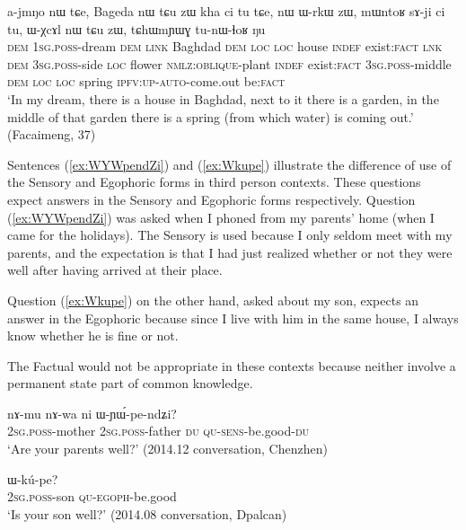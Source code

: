\documentclass[oldfontcommands,oneside,a4paper,11pt]{article}
\newcommand{\ipa}[1]{{\phon \mbox{#1}}} %
\newcommand{\refb}[1]{(\ref{#1})}
\begin{document}
\begin{exe}
\ex  \label{ex:ajmNo}
\gll \ipa{nɯ}	\ipa{a-jmŋo}	\ipa{nɯ}	\ipa{tɕe,}	Bageda	\ipa{nɯ} \ipa{tɕu}	\ipa{zɯ}	\ipa{kha}	\ipa{ci}	\ipa{tu}	\ipa{tɕe,} \ipa{nɯ}	\ipa{ɯ-rkɯ}	\ipa{zɯ,}	\ipa{mɯntoʁ}	\ipa{sɤ-ji}	\ipa{ci}	\ipa{tu,}	\ipa{ɯ-χcɤl}	\ipa{nɯ} \ipa{tɕu}	\ipa{zɯ,}	\ipa{tɕhɯmɲɯɣ}	\ipa{tu-nɯ-ɬoʁ}	\ipa{ŋu} \\
\textsc{dem} \textsc{1sg.poss}-dream \textsc{dem} \textsc{link} Baghdad \textsc{dem} \textsc{loc} \textsc{loc} house \textsc{indef} exist:\textsc{fact} \textsc{lnk} \textsc{dem} \textsc{3sg.poss}-side \textsc{loc} flower \textsc{nmlz:oblique}-plant \textsc{indef} exist:\textsc{fact} \textsc{3sg.poss}-middle 
\textsc{dem} \textsc{loc} \textsc{loc} spring \textsc{ipfv:up-auto}-come.out be:\textsc{fact} \\
\glt `In my dream, there is a house in Baghdad, next to it there is a garden, in the middle of that garden there is a spring (from which water) is coming out.' (Facaimeng, 37)
\end{exe}

Sentences \refb{ex:WYWpendZi} and \refb{ex:Wkupe} illustrate the difference of use of the Sensory and Egophoric forms in third person contexts. These questions expect answers in the Sensory and Egophoric forms respectively. Question \refb{ex:WYWpendZi} was asked when I phoned from my parents' home (when I came for the holidays). The Sensory is used because I only seldom meet with my parents, and the expectation is that I had just realized whether or not they were well after having arrived at their place. 

Question \refb{ex:Wkupe} on the other hand, asked about my son, expects an answer in the Egophoric because since I live with him in the same house, I always know whether he is fine or not.

The Factual would not be appropriate in these contexts because neither involve a permanent state part of common knowledge.

\begin{exe}
\ex \label{ex:WYWpendZi}
\gll 
\ipa{nɤ-mu}  	\ipa{nɤ-wa}  	\ipa{ni}  	\ipa{ɯ-ɲɯ́-pe-ndʑi?}  \\
\textsc{2sg.poss}-mother \textsc{2sg.poss}-father \textsc{du} \textsc{qu-sens}-be.good-\textsc{du} \\
\glt `Are your parents well?' (2014.12 conversation, Chenzhen)
\end{exe}


\begin{exe}
\ex \label{ex:Wkupe}
\gll \ipa{nɤ-tɕɯ} \ipa{ɯ-kú-pe?}\\
\textsc{2sg.poss}-son \textsc{qu-egoph}-be.good\\
\glt `Is your son well?' (2014.08 conversation, Dpalcan)
\end{exe}
\end{document}
